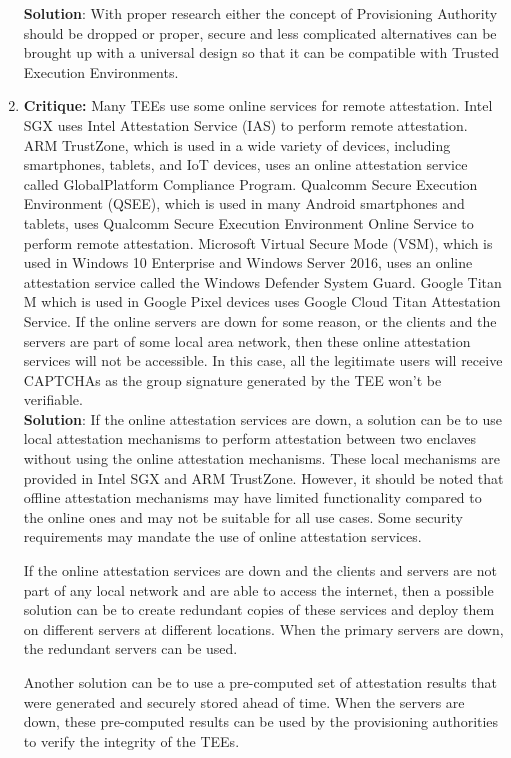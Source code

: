 \documentclass[runningheads,10pt]{llncs}
\begin{document}
\begin{enumerate}
		\textbf{Solution}: With proper research either the concept of Provisioning Authority should be dropped or proper, secure and less complicated alternatives can be brought up with a universal design so that it can be compatible with Trusted Execution Environments.\\

		\item \textbf{Critique:} Many TEEs use some online services for remote attestation. Intel SGX uses Intel Attestation Service (IAS) to perform remote attestation. ARM TrustZone, which is used in a wide variety of devices, including smartphones, tablets, and IoT devices, uses an online attestation service called GlobalPlatform Compliance Program. Qualcomm Secure Execution Environment (QSEE), which is used in many Android smartphones and tablets, uses Qualcomm Secure Execution Environment Online Service to perform remote attestation. Microsoft Virtual Secure Mode (VSM), which is used in Windows 10 Enterprise and Windows Server 2016, uses an online attestation service called the Windows Defender System Guard. Google Titan M which is used in Google Pixel devices uses Google Cloud Titan Attestation Service.
		If the online servers are down for some reason, or the clients and the servers are part of some local area network, then these online attestation services will not be accessible. In this case, all the legitimate users will receive CAPTCHAs as the group signature generated by the TEE won’t be verifiable. \\

		\textbf{Solution}: If the online attestation services are down, a solution can be to use local attestation mechanisms to perform attestation between two enclaves without using the online attestation mechanisms. These local mechanisms are provided in Intel SGX and ARM TrustZone. However, it should be noted that offline attestation mechanisms may have limited functionality compared to the online ones and may not be suitable for all use cases. Some security requirements may mandate the use of online attestation services.

		If the online attestation services are down and the clients and servers are not part of any local network and are able to access the internet, then a possible solution can be to create redundant copies of these services and deploy them on different servers at different locations. When the primary servers are down, the redundant servers can be used.

		Another solution can be to use a pre-computed set of attestation results that were generated and securely stored ahead of time. When the servers are down, these pre-computed results can be used by the provisioning authorities to verify the integrity of the TEEs.\\


\end{enumerate}
\end{document}
